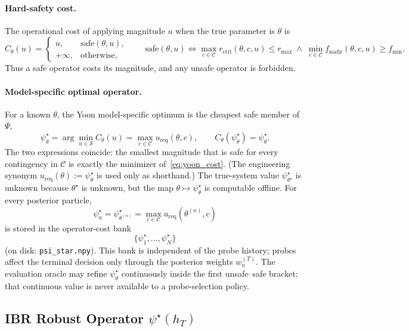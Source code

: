 \documentclass[11pt]{article}
\begin{document}
\paragraph{Hard-safety cost.}
The operational cost of applying magnitude \(u\) when the true parameter is
\(\theta\) is
\[
\boxed{
C_\theta(u)
=
\begin{cases}
u, & \mathrm{safe}(\theta,u),\\
+\infty, & \text{otherwise},
\end{cases}
\qquad
\mathrm{safe}(\theta,u)
\iff
\max_{c\in\mathcal C}
r_{\mathrm{ctrl}}(\theta,c,u)\le r_{\max}
\;\wedge\;
\min_{c\in\mathcal C}
f_{\mathrm{nadir}}(\theta,c,u)\ge f_{\min}.
}
\label{eq:yoon_cost}
\]
Thus a safe operator costs its magnitude, and any unsafe operator is forbidden.

\paragraph{Model-specific optimal operator.}
For a known \(\theta\), the Yoon model-specific optimum is the cheapest safe
member of \(\Psi\),
\[
\boxed{
\psi_\theta^\star
=
\arg\min_{u\in\mathcal S}C_\theta(u)
=
\max_{c\in\mathcal C}u_{\mathrm{req}}(\theta,c),
\qquad
C_\theta\!\left(\psi_\theta^\star\right)=\psi_\theta^\star.
}
\label{eq:model_optimal_ops}
\]
The two expressions coincide: the smallest magnitude that is safe for every
contingency in \(\mathcal C\) is exactly the minimizer of~\eqref{eq:yoon_cost}.
(The engineering synonym \(u_{\mathrm{req}}(\theta):=\psi_\theta^\star\) is
used only as shorthand.) The true-system value \(\psi_{\theta^\star}^\star\) is
unknown because \(\theta^\star\) is unknown, but the map
\(\theta\mapsto\psi_\theta^\star\) is computable offline. For every posterior
particle,
\[
\psi_n^\star
=
\psi_{\theta^{(n)}}^\star
=
\max_{c\in\mathcal C}
u_{\mathrm{req}}\left(\theta^{(n)},c\right)
\]
is stored in the operator-cost bank
\[
\{\psi_1^\star,\ldots,\psi_N^\star\}
\]
(on disk: \texttt{psi\_star.npy}). This bank is independent of the probe
history; probes affect the terminal decision only through the posterior weights
\(w_n^{(T)}\). The evaluation oracle may refine \(\psi_\theta^\star\)
continuously inside the first unsafe--safe bracket; that continuous value is
never available to a probe-selection policy.

\subsection{IBR Robust Operator \(\psi^\star(h_T)\)}
\end{document}
